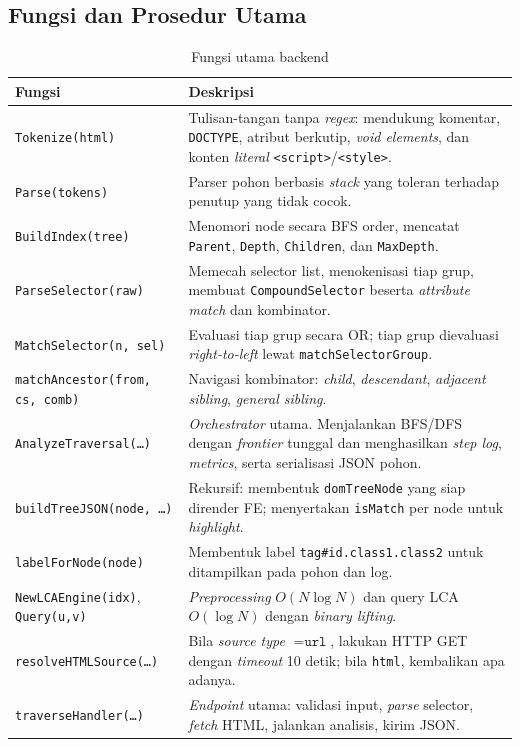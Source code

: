 \subsection{Fungsi dan Prosedur Utama}

\begin{table}[H]
\centering
\caption{Fungsi utama backend}
\begin{tabularx}{\textwidth}{|l|X|}
\hline
\textbf{Fungsi} & \textbf{Deskripsi} \\
\hline
\texttt{Tokenize(html)} & Tulisan-tangan tanpa \textit{regex}: mendukung komentar, \texttt{DOCTYPE}, atribut berkutip, \textit{void elements}, dan konten \textit{literal} \texttt{<script>}/\texttt{<style>}. \\
\hline
\texttt{Parse(tokens)} & Parser pohon berbasis \textit{stack} yang toleran terhadap penutup yang tidak cocok. \\
\hline
\texttt{BuildIndex(tree)} & Menomori node secara BFS order, mencatat \texttt{Parent}, \texttt{Depth}, \texttt{Children}, dan \texttt{MaxDepth}. \\
\hline
\texttt{ParseSelector(raw)} & Memecah selector list, menokenisasi tiap grup, membuat \texttt{CompoundSelector} beserta \textit{attribute match} dan kombinator. \\
\hline
\texttt{MatchSelector(n, sel)} & Evaluasi tiap grup secara OR; tiap grup dievaluasi \textit{right-to-left} lewat \texttt{matchSelectorGroup}. \\
\hline
\texttt{matchAncestor(from, cs, comb)} & Navigasi kombinator: \textit{child}, \textit{descendant}, \textit{adjacent sibling}, \textit{general sibling}. \\
\hline
\texttt{AnalyzeTraversal(\dots)} & \textit{Orchestrator} utama. Menjalankan BFS/DFS dengan \textit{frontier} tunggal dan menghasilkan \textit{step log}, \textit{metrics}, serta serialisasi JSON pohon. \\
\hline
\texttt{buildTreeJSON(node, \dots)} & Rekursif: membentuk \texttt{domTreeNode} yang siap dirender FE; menyertakan \texttt{isMatch} per node untuk \textit{highlight}. \\
\hline
\texttt{labelForNode(node)} & Membentuk label \texttt{tag\#id.class1.class2} untuk ditampilkan pada pohon dan log. \\
\hline
\texttt{NewLCAEngine(idx)}, \texttt{Query(u,v)} & \textit{Preprocessing} $O(N\log N)$ dan query LCA $O(\log N)$ dengan \textit{binary lifting}. \\
\hline
\texttt{resolveHTMLSource(\dots)} & Bila \textit{source type} $= \texttt{url}$, lakukan HTTP GET dengan \textit{timeout} 10 detik; bila \texttt{html}, kembalikan apa adanya. \\
\hline
\texttt{traverseHandler(\dots)} & \textit{Endpoint} utama: validasi input, \textit{parse} selector, \textit{fetch} HTML, jalankan analisis, kirim JSON. \\
\hline
\end{tabularx}
\end{table}

